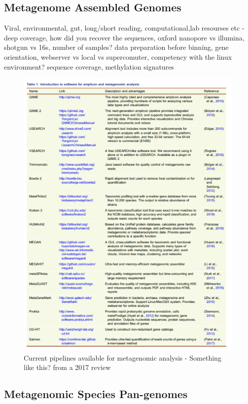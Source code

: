 \documentclass{article}
\begin{document}
\subsection{Metagenome Assembled Genomes}
Viral, environmental, gut, long/short reading, computational,lab resourses etc - deep coverage, how did you recover the sequences, oxford nanopore vs illumina, shotgun vs 16s, number of samples? data preparation before binning, gene orientation, webserver vs local vs supercomuter, competency with the linux environment? sequence coverage, methylation signatures
\begin{figure}
\centering
\includegraphics[scale=0.7]{figures/table.png}
\caption[Current pipelines available for metagenomic analysis]{
	Current pipelines available for metagenomic analysis - Something like this? from a 2017 review}
\label{Fpipelines}
\end{figure}

\subsection{Metagenomic Species Pan-genomes}
\end{document}
